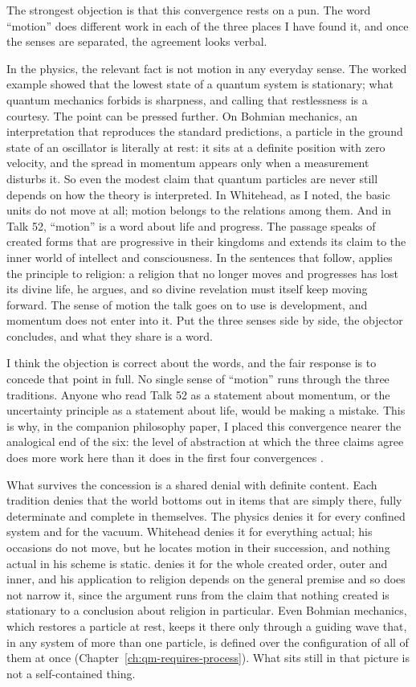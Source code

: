 The strongest objection is that this convergence rests on a pun. The word ``motion'' does different work in each of the three places I have found it, and once the senses are separated, the agreement looks verbal.

In the physics, the relevant fact is not motion in any everyday sense. The worked example showed that the lowest state of a quantum system is stationary; what quantum mechanics forbids is sharpness, and calling that restlessness is a courtesy. The point can be pressed further. On Bohmian mechanics, an interpretation that reproduces the standard predictions, a particle in the ground state of an oscillator is literally at rest: it sits at a definite position with zero velocity, and the spread in momentum appears only when a measurement disturbs it. So even the modest claim that quantum particles are never still depends on how the theory is interpreted. In Whitehead, as I noted, the basic units do not move at all; motion belongs to the relations among them. And in Talk 52, ``motion'' is a word about life and progress. The passage speaks of created forms that are progressive in their kingdoms and extends its claim to the inner world of intellect and consciousness. In the sentences that follow, \AbdulBaha applies the principle to religion: a religion that no longer moves and progresses has lost its divine life, he argues, and so divine revelation must itself keep moving forward. The sense of motion the talk goes on to use is development, and momentum does not enter into it. Put the three senses side by side, the objector concludes, and what they share is a word.

I think the objection is correct about the words, and the fair response is to concede that point in full. No single sense of ``motion'' runs through the three traditions. Anyone who read Talk 52 as a statement about momentum, or the uncertainty principle as a statement about life, would be making a mistake. This is why, in the companion philosophy paper, I placed this convergence nearer the analogical end of the six: the level of abstraction at which the three claims agree does more work here than it does in the first four convergences \citep{AdamsThreePaths}.

What survives the concession is a shared denial with definite content. Each tradition denies that the world bottoms out in items that are simply there, fully determinate and complete in themselves. The physics denies it for every confined system and for the vacuum. Whitehead denies it for everything actual; his occasions do not move, but he locates motion in their succession, and nothing actual in his scheme is static. \AbdulBaha denies it for the whole created order, outer and inner, and his application to religion depends on the general premise and so does not narrow it, since the argument runs from the claim that nothing created is stationary to a conclusion about religion in particular. Even Bohmian mechanics, which restores a particle at rest, keeps it there only through a guiding wave that, in any system of more than one particle, is defined over the configuration of all of them at once (Chapter~\ref{ch:qm-requires-process}). What sits still in that picture is not a self-contained thing.

